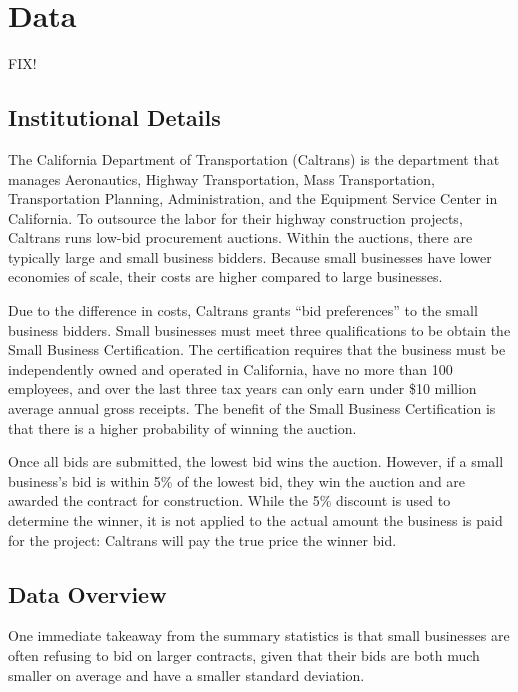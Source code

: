 \section{Data}


FIX!

\subsection{Institutional Details}

The California Department of Transportation (Caltrans) is the department that
manages Aeronautics, Highway Transportation, Mass Transportation,
Transportation Planning, Administration, and the Equipment Service Center in
California. To outsource the labor for their highway construction projects,
Caltrans runs low-bid procurement auctions. Within the auctions, there are
typically large and small business bidders. Because small businesses have lower
economies of scale, their costs are higher compared to large businesses.

Due to the difference in costs, Caltrans grants ``bid preferences'' to the small
business bidders. Small businesses must meet three qualifications to be obtain
the Small Business Certification. The certification requires that the business
must be independently owned and operated in California, have no more than 100
employees, and over the last three tax years can only earn under \$10 million
average annual gross receipts. The benefit of the Small Business Certification
is that there is a higher probability of winning the auction.

Once all bids are submitted, the lowest bid wins the auction. However, if a
small business’s bid is within 5\% of the lowest bid, they win the auction and
are awarded the contract for construction. While the 5\% discount is used to
determine the winner, it is not applied to the actual amount the business is
paid for the project: Caltrans will pay the true price the winner bid.

\subsection{Data Overview}



One immediate takeaway from the summary statistics is that small businesses are often
refusing to bid on larger contracts, given that their bids are both
much smaller on average and have a smaller standard deviation.


